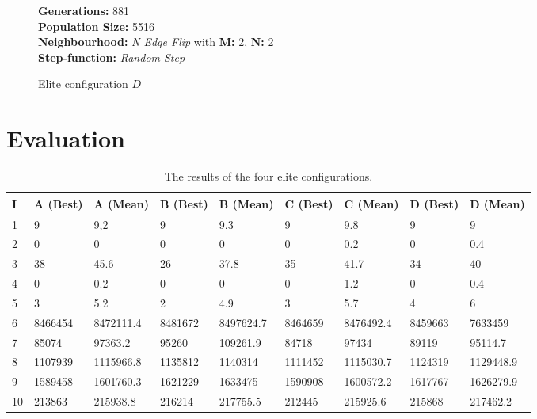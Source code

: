 \documentclass [11pt]{article}
\begin{document}
\begin{figure}[H]
  \textbf{Generations:} 881 \\
\textbf{Population Size:} 5516 \\
\textbf{Neighbourhood:} \emph{N Edge Flip} with \textbf{M:} 2, \textbf{N:} 2\\
\textbf{Step-function:} \emph{Random Step} 
\caption{Elite configuration $D$}
\end{figure}

\section{Evaluation}

\begin{table}[]
\centering
\caption{The results of the four elite configurations.}
\label{my-label}
\begin{tabular}{|l|l|l|l|l|l|l|l|l|}
\hline
I & A (Best) & A (Mean)  & B (Best) & B (Mean)  & C (Best) & C (Mean)  & D (Best) & D (Mean)  \\ \hline
1        & 9        & 9,2       & 9        & 9.3       & 9        & 9.8       & 9        & 9         \\ \hline
2        & 0        & 0         & 0        & 0         & 0        & 0.2       & 0        & 0.4       \\ \hline
3        & 38       & 45.6      & 26       & 37.8      & 35       & 41.7      & 34       & 40        \\ \hline
4        & 0        & 0.2       & 0        & 0         & 0        & 1.2       & 0        & 0.4       \\ \hline
5        & 3        & 5.2       & 2        & 4.9       & 3        & 5.7       & 4        & 6         \\ \hline
6        & 8466454  & 8472111.4 & 8481672  & 8497624.7 & 8464659  & 8476492.4 & 8459663  & 7633459   \\ \hline
7        & 85074    & 97363.2   & 95260    & 109261.9  & 84718    & 97434     & 89119    & 95114.7   \\ \hline
8        & 1107939  & 1115966.8 & 1135812  & 1140314   & 1111452  & 1115030.7 & 1124319  & 1129448.9 \\ \hline
9        & 1589458  & 1601760.3 & 1621229  & 1633475   & 1590908  & 1600572.2 & 1617767  & 1626279.9 \\ \hline
10       & 213863   & 215938.8  & 216214   & 217755.5  & 212445   & 215925.6  & 215868   & 217462.2  \\ \hline
\end{tabular}
\end{table}
\end{document}
